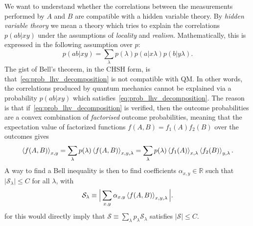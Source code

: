 \documentclass[12pt]{report}
\newcommand{\RR}{\mathbb{R}}
\newcommand{\calS}{{\mathcal{S}}}
\begin{document}
We want to understand whether the correlations between the measurements performed by $A$ and $B$ are compatible with a hidden variable theory.
By \emph{hidden variable theory} we mean a theory which tries to explain the correlations $p(ab|xy)$ under the assumptions of \emph{locality} and \emph{realism}.
Mathematically, this is expressed in the following assumption over $p$:
\begin{equation}
    p(ab|xy) = \sum_\lambda p(\lambda) p(a|x\lambda)p(b|y\lambda).
    \label{eq:prob_lhv_decomposition}
\end{equation}
The gist of Bell's theorem, in the CHSH form, is that~\cref{eq:prob_lhv_decomposition} is not compatible with \ac{QM}. In other words, the correlations produced by quantum mechanics cannot be explained via a probability $p(ab|xy)$ which satisfies~\cref{eq:prob_lhv_decomposition}.
The reason is that if~\cref{eq:prob_lhv_decomposition} is verified, then the outcome probabilities are a convex combination of \emph{factorised} outcome probabilities,
meaning that the expectation value of factorized functions $f(A,B)=f_1(A)f_2(B)$ over the outcomes gives
\begin{equation}
    \expval{f(A,B)}_{x,y} =
    \sum_\lambda p(\lambda) \expval{f(A,B)}_{x,y,\lambda} =
    \sum_\lambda p(\lambda) \expval{f_1(A)}_{x,\lambda} \expval{f_2(B)}_{y,\lambda}.
\end{equation}
A way to find a Bell inequality is then to find coefficients $\alpha_{x,y}\in\RR$ such that $\lvert \calS_\lambda\rvert\le C$ for all $\lambda$, with
\begin{equation}
    \calS_\lambda \equiv \Big\lvert
        \sum_{x,y} \alpha_{x,y} \expval{f(A,B)}_{x,y,\lambda}
    \Big\rvert.
\end{equation}
for this would directly imply that $\calS\equiv\sum_\lambda p_\lambda \calS_\lambda$ satisfies $|\calS|\le C$.
\end{document}
